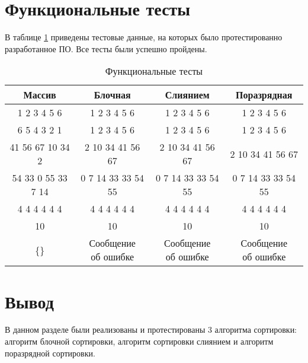 

\clearpage

\section{Функциональные тесты}

В таблице \ref{tbl:func_tests} приведены тестовые данные, на которых было протестированно разработанное ПО. Все тесты были успешно пройдены.

\begin{table}[ht]
	\begin{center}
		\begin{threeparttable}
			\caption{Функциональные тесты}
			\label{tbl:func_tests}
			\begin{tabular}{|c|c|c|c|}
				\hline
				\bfseries Массив & \bfseries Блочная & \bfseries Слиянием & \bfseries Поразрядная \\
				\hline
				1 2 3 4 5 6 & 1 2 3 4 5 6 & 1 2 3 4 5 6 & 1 2 3 4 5 6 \\
				\hline
				6 5 4 3 2 1 & 1 2 3 4 5 6 & 1 2 3 4 5 6 & 1 2 3 4 5 6 \\
				\hline
				41 56 67 10 34 2 & 2 10 34 41 56 67  & 2 10 34 41 56 67  & 2 10 34 41 56 67  \\
				\hline
				54 33 0 55 33 7 14 & 0 7 14 33 33 54 55  & 0 7 14 33 33 54 55  & 0 7 14 33 33 54 55  \\
				\hline
				4 4 4 4 4 4 & 4 4 4 4 4 4  & 4 4 4 4 4 4  & 4 4 4 4 4 4  \\
				\hline
				10 & 10  & 10  & 10  \\
				\hline
				\{\} & \makecell{Сообщение  \\ об ошибке}  & \makecell{Сообщение  \\ об ошибке}  & \makecell{Сообщение  \\ об ошибке}  \\
				\hline
			\end{tabular}
		\end{threeparttable}
	\end{center}
\end{table}


\section*{Вывод}

В данном разделе были реализованы и протестированы 3 алгоритма сортировки:
алгоритм блочной сортировки, алгоритм сортировки слиянием и алгоритм поразрядной сортировки.

    